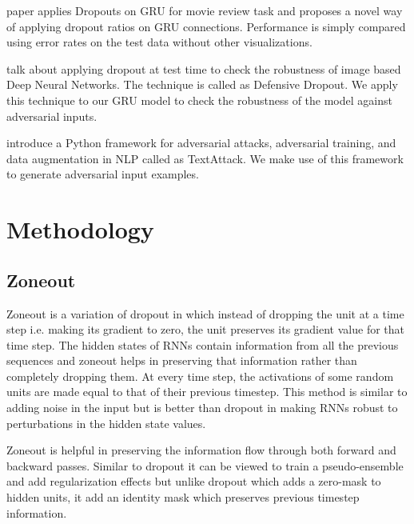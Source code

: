 \documentclass{article}
\begin{document}
\cite{gal2016theoretically} paper applies Dropouts on GRU for movie review task and proposes a novel way of applying dropout ratios on GRU connections. Performance is simply compared using error rates on the test data without other visualizations. 

\cite{DBLP:journals/corr/abs-1809-05165} talk about applying dropout at test time to check the robustness of image based Deep Neural Networks. The technique is called as Defensive Dropout. We apply this technique to our GRU model to check the robustness of the model against adversarial inputs.

\cite{morris2020textattack} introduce a Python framework for adversarial attacks, adversarial training, and data augmentation in NLP called as TextAttack. We make use of this framework to generate adversarial input examples. 

\section{Methodology}

\subsection{Zoneout}
Zoneout is a variation of dropout in which instead of dropping the unit at a time step i.e. making its gradient to zero, the unit preserves its gradient value for that time step. The hidden states of RNNs contain information from all the previous sequences and zoneout helps in preserving that information rather than completely dropping them. At every time step, the activations of some random units are made equal to that of their previous timestep. This method is similar to adding noise in the input but is better than dropout in making RNNs robust to perturbations in the hidden state values.

Zoneout is helpful in preserving the information flow through both forward and backward passes. Similar to dropout it can be viewed to train a pseudo-ensemble and add regularization effects but unlike dropout which adds a zero-mask to hidden units, it add an identity mask which preserves previous timestep information.
\end{document}
